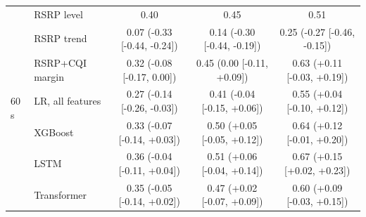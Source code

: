 \documentclass[preprint,review,12pt]{elsarticle}
\begin{document}
\begin{table}[!htbp]
{\begin{tabular}{llccc}
\midrule
\multirow{7}{*}{60\,s} & RSRP level & 0.40 & 0.45 & 0.51 \\
 & RSRP trend & 0.07 (-0.33 [-0.44, -0.24]) & 0.14 (-0.30 [-0.44, -0.19]) & 0.25 (-0.27 [-0.46, -0.15]) \\
 & RSRP+CQI margin & 0.32 (-0.08 [-0.17, 0.00]) & 0.45 (0.00 [-0.11, +0.09]) & 0.63 (+0.11 [-0.03, +0.19]) \\
 & LR, all features & 0.27 (-0.14 [-0.26, -0.03]) & 0.41 (-0.04 [-0.15, +0.06]) & 0.55 (+0.04 [-0.10, +0.12]) \\
 & XGBoost & 0.33 (-0.07 [-0.14, +0.03]) & 0.50 (+0.05 [-0.05, +0.12]) & 0.64 (+0.12 [-0.01, +0.20]) \\
 & LSTM & 0.36 (-0.04 [-0.11, +0.04]) & 0.51 (+0.06 [-0.04, +0.14]) & 0.67 (+0.15 [+0.02, +0.23]) \\
 & Transformer & 0.35 (-0.05 [-0.14, +0.02]) & 0.47 (+0.02 [-0.07, +0.09]) & 0.60 (+0.09 [-0.03, +0.15]) \\
\bottomrule
\end{tabular}}
\end{table}
\end{document}
